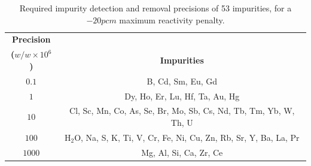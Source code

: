 \documentclass[11pt]{article}
\newcommand{\E}[1]{\times10^{#1}}
\newcommand{\water}[0]{$\mathrm{H_2O}$}
\begin{document}
\clearpage
\begin{table}[ht]\footnotesize
    \centering
    \caption{Required impurity detection and removal precisions of 53 impurities, for a $-20pcm$ maximum reactivity penalty.}
    \label{tab:precision}
    \begin{tabular}{| c | c |} \hline
    \textbf{Precision}     & \\
    \textbf{($w/w \E{6}$)} & \textbf{Impurities} \\ \hline
    $0.1$                  & B, Cd, Sm, Eu, Gd \\ \hline
    $1$                    & Dy, Ho, Er, Lu, Hf, Ta, Au, Hg \\ \hline
    $10$                   & Cl, Sc, Mn, Co, As, Se, Br, Mo, Sb, Cs, Nd, Tb, Tm, Yb, W, Th, U \\ \hline
    $100$                  & \water{}, Na, S, K, Ti, V, Cr, Fe, Ni, Cu, Zn, Rb, Sr, Y, Ba, La, Pr \\ \hline
    $1000$                 & Mg, Al, Si, Ca, Zr, Ce \\ \hline
    \end{tabular}
\end{table}
\end{document}
